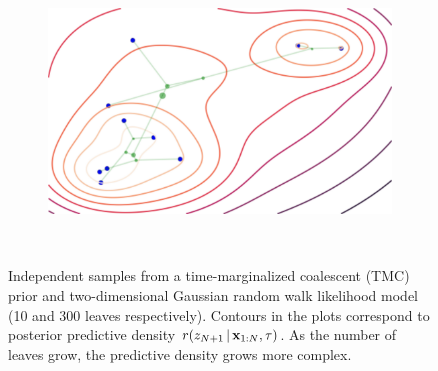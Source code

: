 \begin{figure}[t]
\centering
\begin{subfigure}[t]{0.4\textwidth}
    \centering
    \includegraphics[frame, width=\textwidth]{img/loracs/tmc/tmc-small-cropped}
\end{subfigure}
~
\begin{subfigure}[t]{0.4\textwidth}
    \centering
\end{subfigure}
\caption{Independent samples from a time-marginalized coalescent (TMC) prior and two-dimensional Gaussian random walk likelihood model (10 and 300 leaves respectively). 
Contours in the plots correspond to posterior predictive density $r(z_{N + 1} \,|\, \mathbf{x}_{1:N}, \tau)$.
As the number of leaves grow, the predictive density grows more complex.}
\label{fig:tmc-samples}
\end{figure}

